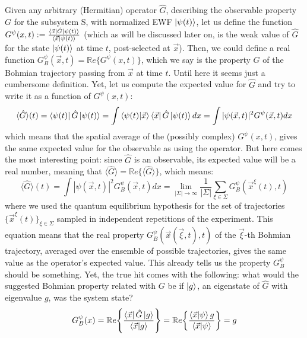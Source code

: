 \documentclass[11pt, a4paper]{article} %
\begin{document}
Given any arbitrary (Hermitian) operator $\hat{G}$, describing the observable property $G$ for the subsystem S, with normalized EWF $\ket{\psi(t)}$, let us define the function $G^{\psi}(x,t):=\frac{\bra{\vec{x}}\hat{G}\ket{\psi(t)}}{\bra{\vec{x}}\ket{\psi(t)}}$ (which as will be discussed later on, is the weak value \cite{Weak} of $\hat{G}$ for the state $\ket{\psi(t)}$ at time $t$, post-selected at $\vec{x}$). Then, we could define a real function $G_B^\psi(\vec{x},t)=\mathbb{R}e\{G^{\psi}(x,t)\}$, which we say is the property $G$ of the Bohmian trajectory passing from $\vec{x}$ at time $t$. Until here it seems just a cumbersome definition. Yet, let us compute the expected value for $\hat{G}$ and try to write it as a function of $G^\psi(x,t)$:
\begin{equation}
\langle \hat{G}\rangle(t)= \bra{\psi(t)}\hat{G}\ket{\psi(t)}=\int \bra{\psi(t)} \ket{\vec{x}}\bra{\vec{x}}\hat{G}\ket{\psi(t)}dx =  \int |\psi(\vec{x},t)|^2G^\psi(\vec{x},t)dx
\end{equation}
which means that the spatial average of the (possibly complex) $G^\psi(x,t)$, gives the same expected value for the observable as using the operator. But here comes the most interesting point: since $\hat{G}$ is an observable, its expected value will be a real number, meaning that $\langle \hat{G}\rangle=\mathbb{R}e\{\langle \hat{G}\rangle\}$, which means:
\begin{equation}
\langle \hat{G}\rangle(t)=\int |\psi(\vec{x},t)|^2G_B^\psi(\vec{x},t)dx= \lim_{|\Sigma|\rightarrow \infty}\frac{1}{|\Sigma|} \sum_{\xi\in\Sigma} G_B^\psi(\vec{x}^\xi(t),t)
\end{equation}
where we used the quantum equilibrium hypothesis \cite{Absolute} for the set of trajectories $\{\vec{x}^\xi(t)\}_{\xi\in\Sigma}$ sampled in independent repetitions of the experiment. This equation means that the real property $G_B^\psi(\vec{x}(\vec{\xi},t),t)$ of the $\vec{\xi}$-th Bohmian trajectory, averaged over the ensemble of possible trajectories, gives the same value as the operator's expected value. This already tells us the property $G^\psi_B$ should be something. Yet, the true hit comes with the following: what would the suggested Bohmian property related with $G$ be if $\ket{g}$, an eigenstate of $\hat{G}$ with eigenvalue $g$, was the system state?
\begin{equation}
G_B^\psi(x)=\mathbb{R}e\qty{ \frac{\bra{\vec{x}}\hat{G}\ket{g}}{\bra{\vec{x}}\ket{g}} } = \mathbb{R}e\qty{ \frac{\bra{\vec{x}}\ket{\psi}g}{\bra{\vec{x}}\ket{\psi}} }=g
\end{equation}
\end{document}

